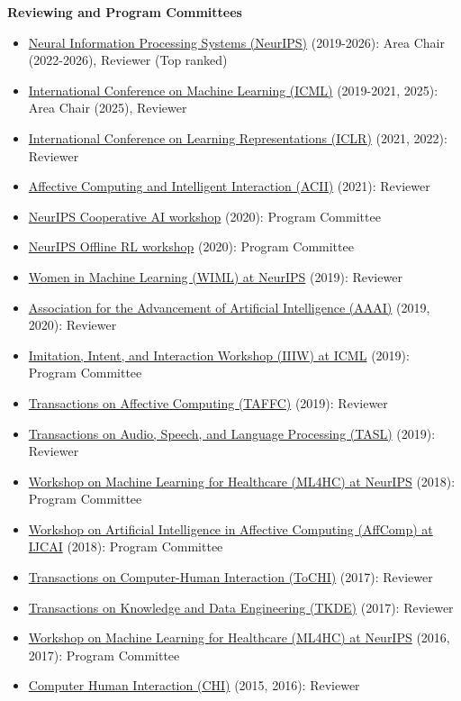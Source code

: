 \documentclass[paper=letter,fontsize=11pt]{scrartcl} %
\newcommand{\CommitteeEntry}[4]{
		\noindent \href{#4}{#1} (#2): #3}
\begin{document}
\noindent \textbf{Reviewing and Program Committees}
\begin{itemize}
    \item \CommitteeEntry{Neural Information Processing Systems (NeurIPS)}{2019-2026}{Area Chair (2022-2026), Reviewer (Top ranked)}{}
    \item \CommitteeEntry{International Conference on Machine Learning (ICML)}{2019-2021, 2025}{Area Chair (2025), Reviewer}{}
    \item \CommitteeEntry{International Conference on Learning Representations (ICLR)}{2021, 2022}{Reviewer}{}
    \item \CommitteeEntry{Affective Computing and Intelligent Interaction (ACII)}{2021}{Reviewer}{}
    \item \CommitteeEntry{NeurIPS Cooperative AI workshop}{2020}{Program Committee}{}
    \item \CommitteeEntry{NeurIPS Offline RL workshop}{2020}{Program Committee}{}
    \item \CommitteeEntry{Women in Machine Learning (WIML) at NeurIPS}{2019}{Reviewer}{}
    \item \CommitteeEntry{Association for the Advancement of Artificial Intelligence (AAAI)}{2019, 2020}{Reviewer}{}
    \item \CommitteeEntry{Imitation, Intent, and Interaction Workshop (IIIW) at ICML}{2019}{Program Committee}{}
    \item \CommitteeEntry{Transactions on Affective Computing (TAFFC)}{2019}{Reviewer}{}
    \item \CommitteeEntry{Transactions on Audio, Speech, and Language Processing (TASL)}{2019}{Reviewer}{}
    \item \CommitteeEntry{Workshop on Machine Learning for Healthcare (ML4HC) at NeurIPS}{2018}{Program Committee}{}
    \item \CommitteeEntry{Workshop on Artificial Intelligence in Affective Computing (AffComp) at IJCAI}{2018}{Program Committee}{}
    \item \CommitteeEntry{Transactions on Computer-Human Interaction (ToCHI)}{2017}{Reviewer}{}
    \item \CommitteeEntry{Transactions on Knowledge and Data Engineering (TKDE)}{2017}{Reviewer}{}
    \item \CommitteeEntry{Workshop on Machine Learning for Healthcare (ML4HC) at NeurIPS}{2016, 2017}{Program Committee}{}
    \item \CommitteeEntry{Computer Human Interaction (CHI)}{2015, 2016}{Reviewer}{}

\end{itemize}
\end{document}
